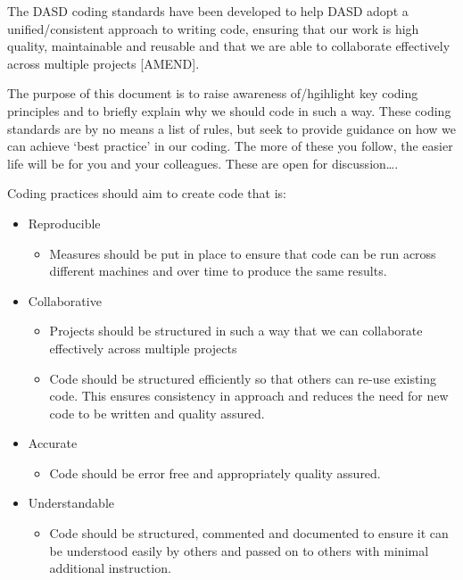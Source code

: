 \documentclass[]{book}
\providecommand{\tightlist}{%
  \setlength{\itemsep}{0pt}\setlength{\parskip}{0pt}}
\begin{document}
The DASD coding standards have been developed to help DASD adopt a unified/consistent approach to writing code, ensuring that our work is high quality, maintainable and reusable and that we are able to collaborate effectively across multiple projects {[}AMEND{]}.

The purpose of this document is to raise awareness of/hgihlight key coding principles and to briefly explain why we should code in such a way. These coding standards are by no means a list of rules, but seek to provide guidance on how we can achieve `best practice' in our coding. The more of these you follow, the easier life will be for you and your colleagues. These are open for discussion\ldots.

Coding practices should aim to create code that is:

\begin{itemize}
\tightlist
\item
  Reproducible

  \begin{itemize}
  \tightlist
  \item
    Measures should be put in place to ensure that code can be run across different machines and over time to produce the same results.\\
  \end{itemize}
\item
  Collaborative

  \begin{itemize}
  \tightlist
  \item
    Projects should be structured in such a way that we can collaborate effectively across multiple projects
  \item
    Code should be structured efficiently so that others can re-use existing code. This ensures consistency in approach and reduces the need for new code to be written and quality assured.\\
  \end{itemize}
\item
  Accurate

  \begin{itemize}
  \tightlist
  \item
    Code should be error free and appropriately quality assured.\\
  \end{itemize}
\item
  Understandable

  \begin{itemize}
  \tightlist
  \item
    Code should be structured, commented and documented to ensure it can be understood easily by others and passed on to others with minimal additional instruction.
  \end{itemize}
\end{itemize}
\end{document}
